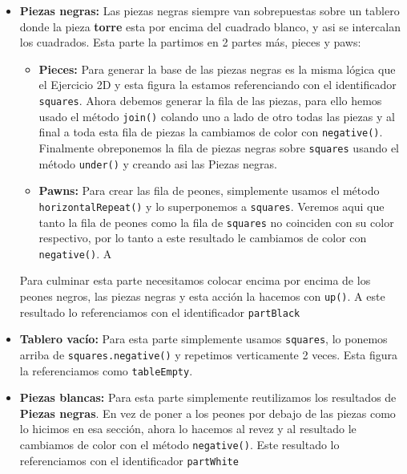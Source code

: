 \documentclass[10pt, a4paper]{article}
\newcommand{\mintpython}[1]{\texttt{#1}}
\begin{document}
\begin{itemize}
  \item \textbf{Piezas negras:} Las piezas negras siempre van sobrepuestas sobre un tablero donde la pieza \textbf{torre} esta por encima del cuadrado blanco, y asi se intercalan los cuadrados. Esta parte la partimos en 2 partes más, pieces y paws:
    \begin{itemize}
      \item \textbf{Pieces:} Para generar la base de las piezas negras es la misma lógica que el Ejercicio 2D y esta figura la estamos referenciando con el identificador \mintpython{squares}. Ahora debemos generar la fila de las piezas, para ello hemos usado el método \mintpython{join()} colando uno a lado de otro todas las piezas y al final a toda esta fila de piezas la cambiamos de color con \mintpython{negative()}. Finalmente obreponemos la fila de piezas negras sobre \mintpython{squares} usando el método \mintpython{under()} y creando asi las Piezas negras.

      \item \textbf{Pawns:} Para crear las fila de peones, simplemente usamos el método \mintpython{horizontalRepeat()} y lo superponemos a \mintpython{squares}. Veremos aqui que tanto la fila de peones como la fila de \mintpython{squares} no coinciden con su color respectivo, por lo tanto a este resultado le cambiamos de color con \mintpython{negative()}. A
    \end{itemize} 
    Para culminar esta parte necesitamos colocar encima por encima de los peones negros, las piezas negras y esta acción la hacemos con \mintpython{up()}. A este resultado lo referenciamos con el identificador \mintpython{partBlack}

  \item \textbf{Tablero vacío:} Para esta parte simplemente usamos \mintpython{squares}, lo ponemos arriba de \mintpython{squares.negative()} y repetimos verticamente 2 veces. Esta figura la referenciamos como \mintpython{tableEmpty}.

  \item \textbf{Piezas blancas:} Para esta parte simplemente reutilizamos los resultados de \textbf{Piezas negras}. En vez de poner a los peones por debajo de las piezas como lo hicimos en esa sección, ahora lo hacemos al revez y al resultado le cambiamos de color con el método \mintpython{negative()}. Este resultado lo referenciamos con el identificador \mintpython{partWhite}
\end{itemize}
\end{document}
